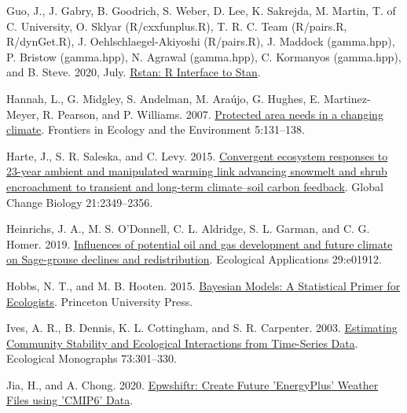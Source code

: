 \documentclass[
  12pt,
]{article}
\newlength{\cslhangindent}
\newlength{\cslentryspacingunit} %
\newenvironment{CSLReferences}[2] %
 {%
  \setlength{\parindent}{0pt}
  \ifodd #1
  \let\oldpar\par
  \def\par{\hangindent=\cslhangindent\oldpar}
  \fi
  \setlength{\parskip}{#2\cslentryspacingunit}
 }%
 {}
\begin{document}
\begin{CSLReferences}{1}{0}
\leavevmode{}%
Guo, J., J. Gabry, B. Goodrich, S. Weber, D. Lee, K. Sakrejda, M. Martin, T. of C. University, O. Sklyar (R/cxxfunplus.R), T. R. C. Team (R/pairs.R, R/dynGet.R), J. Oehlschlaegel-Akiyoshi (R/pairs.R), J. Maddock (gamma.hpp), P. Bristow (gamma.hpp), N. Agrawal (gamma.hpp), C. Kormanyos (gamma.hpp), and B. Steve. 2020, July. \href{https://CRAN.R-project.org/package=rstan}{Rstan: {R} {Interface} to {Stan}}.

\leavevmode{}%
Hannah, L., G. Midgley, S. Andelman, M. Araújo, G. Hughes, E. Martinez-Meyer, R. Pearson, and P. Williams. 2007. \href{https://doi.org/10.1890/1540-9295(2007)5\%5B131:PANIAC\%5D2.0.CO;2}{Protected area needs in a changing climate}. Frontiers in Ecology and the Environment 5:131--138.

\leavevmode{}%
Harte, J., S. R. Saleska, and C. Levy. 2015. \href{https://doi.org/10.1111/gcb.12831}{Convergent ecosystem responses to 23-year ambient and manipulated warming link advancing snowmelt and shrub encroachment to transient and long-term climate--soil carbon feedback}. Global Change Biology 21:2349--2356.

\leavevmode{}%
Heinrichs, J. A., M. S. O'Donnell, C. L. Aldridge, S. L. Garman, and C. G. Homer. 2019. \href{https://doi.org/10.1002/eap.1912}{Influences of potential oil and gas development and future climate on {Sage}-grouse declines and redistribution}. Ecological Applications 29:e01912.

\leavevmode{}%
Hobbs, N. T., and M. B. Hooten. 2015. \href{https://press.princeton.edu/books/hardcover/9780691159287/bayesian-models}{Bayesian {Models}: {A} {Statistical} {Primer} for {Ecologists}}. Princeton University Press.

\leavevmode{}%
Ives, A. R., B. Dennis, K. L. Cottingham, and S. R. Carpenter. 2003. \href{https://doi.org/10.1890/0012-9615(2003)073\%5B0301:ECSAEI\%5D2.0.CO;2}{Estimating {Community} {Stability} and {Ecological} {Interactions} from {Time}-{Series} {Data}}. Ecological Monographs 73:301--330.

\leavevmode{}%
Jia, H., and A. Chong. 2020. \href{https://CRAN.R-project.org/package=epwshiftr}{Epwshiftr: {Create} {Future} '{EnergyPlus}' {Weather} {Files} using '{CMIP6}' {Data}}.


\end{CSLReferences}
\end{document}
